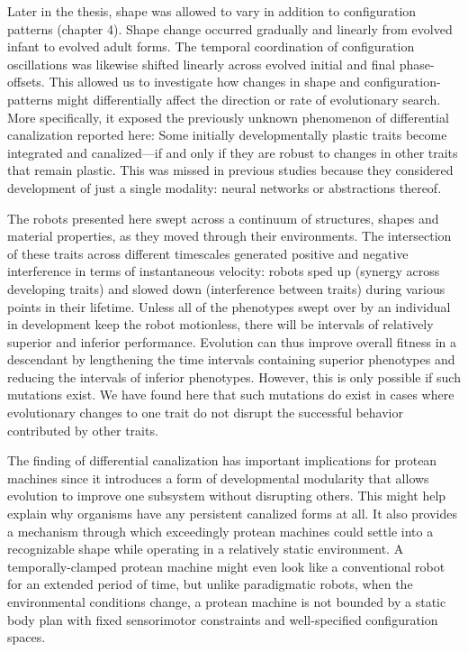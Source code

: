 Later in the thesis, shape was allowed to vary in addition to configuration patterns (chapter 4).
Shape change occurred gradually and linearly from evolved infant to evolved adult forms.
The temporal coordination of configuration oscillations was likewise shifted linearly across evolved initial and final phase-offsets.
This allowed us to investigate how changes in shape and configuration-patterns might differentially affect the direction or rate of evolutionary search.
More specifically, it exposed the previously unknown phenomenon of differential canalization reported here:
Some initially developmentally plastic traits become integrated and canalized---if and only if they are robust to changes in other traits that remain plastic.
This was missed in previous studies because they considered development of just a single modality: neural networks or abstractions thereof.

The robots presented here 
swept across a continuum of structures, shapes and material properties,
as they
moved through their environments.
The intersection of these 
traits across different timescales generated positive and negative interference in terms of instantaneous velocity: 
robots sped up (synergy across developing traits) and slowed down (interference between traits) during various points in their lifetime.
Unless all of the phenotypes swept over by an individual in development keep the robot motionless, there will be intervals of relatively superior and inferior performance.
Evolution can thus improve overall fitness in a descendant by lengthening the time intervals containing superior phenotypes and reducing the intervals of inferior phenotypes. 
However, this is only possible if such mutations exist.
We have found here that such mutations do exist in cases where evolutionary changes
to one trait do not disrupt the successful behavior contributed
by other traits.

The finding of differential canalization has important implications
for protean machines since it introduces a form of developmental modularity
that
allows evolution to improve one subsystem without disrupting others.
This might help explain why organisms have any persistent canalized forms at all.
It also provides a mechanism through which exceedingly protean machines could settle into a recognizable shape while operating in a relatively static environment.
A temporally-clamped protean machine might even look like a conventional robot for an extended period of time, but unlike paradigmatic robots, when the environmental conditions change, a protean machine is not bounded by a static body plan with fixed sensorimotor constraints and well-specified configuration spaces.

